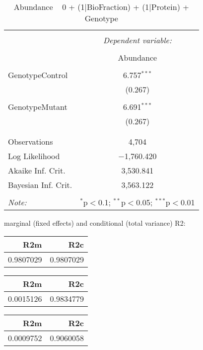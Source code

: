 \documentclass[11pt]{report}
\begin{document}
\begin{table}[!htbp] \centering 
  \caption{Abundance ~ 0 + (1|BioFraction) + (1|Protein) + Genotype} 
  \label{} 
\begin{tabular}{@{\extracolsep{5pt}}lc} 
\\[-1.8ex]\hline 
\hline \\[-1.8ex] 
 & \multicolumn{1}{c}{\textit{Dependent variable:}} \\ 
\cline{2-2} 
\\[-1.8ex] & Abundance \\ 
\hline \\[-1.8ex] 
 GenotypeControl & 6.757$^{***}$ \\ 
  & (0.267) \\ 
  & \\ 
 GenotypeMutant & 6.691$^{***}$ \\ 
  & (0.267) \\ 
  & \\ 
\hline \\[-1.8ex] 
Observations & 4,704 \\ 
Log Likelihood & $-$1,760.420 \\ 
Akaike Inf. Crit. & 3,530.841 \\ 
Bayesian Inf. Crit. & 3,563.122 \\ 
\hline 
\hline \\[-1.8ex] 
\textit{Note:}  & \multicolumn{1}{r}{$^{*}$p$<$0.1; $^{**}$p$<$0.05; $^{***}$p$<$0.01} \\ 
\end{tabular} 
\end{table} 
marginal (fixed effects) and conditional (total variance) R2:

\begin{tabular}{r|r}
\hline
R2m & R2c\\
\hline
0.9807029 & 0.9807029\\
\hline
\end{tabular}

\begin{tabular}{r|r}
\hline
R2m & R2c\\
\hline
0.0015126 & 0.9834779\\
\hline
\end{tabular}

\begin{tabular}{r|r}
\hline
R2m & R2c\\
\hline
0.0009752 & 0.9060058\\
\hline
\end{tabular}
\end{document}
